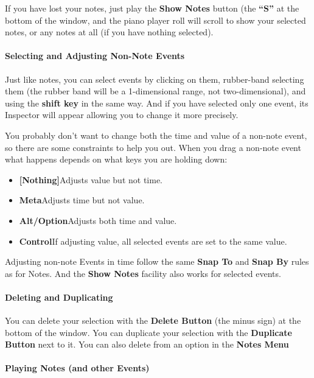 \documentclass[twoside,10pt]{article}
\begin{document}
If you have lost your notes, just play the {\bf Show Notes} button (the {\bf ``S''} at the bottom of the window, and the piano player roll will scroll to show your selected notes, or any notes at all (if you have nothing selected).

\paragraph{Selecting and Adjusting Non-Note Events}

Just like notes, you can select events by clicking on them, rubber-band selecting them (the rubber band will be a 1-dimensional range, not two-dimensional), and using the {\bf shift key} in the same way.  And if you have selected only one event, its Inspector will appear allowing you to change it more precisely.

You probably don't want to change both the time and value of a non-note event, so there are some constraints to help you out.  When you drag a non-note event what happens depends on what keys you are holding down:

\begin{itemize}
\item {\bf [Nothing]}\qquad Adjusts value but not time.
\item {\bf Meta}\qquad Adjusts time but not value.
\item {\bf Alt/Option}\qquad Adjusts both time and value.
\item {\bf Control}\qquad If adjusting value, all selected events are set to the same value.
\end{itemize}        

Adjusting non-note Events in time follow the same {\bf Snap To} and {\bf Snap By} rules as for Notes.  And the {\bf Show Notes} facility also works for selected events.

\paragraph{Deleting and Duplicating}

You can delete your selection with the {\bf Delete Button} (the minus sign) at the bottom of the window.  You can duplicate your selection with the {\bf Duplicate Button} next to it.  You can also delete from an option in the {\bf Notes Menu}  

\paragraph{Playing Notes (and other Events)}
\end{document}
